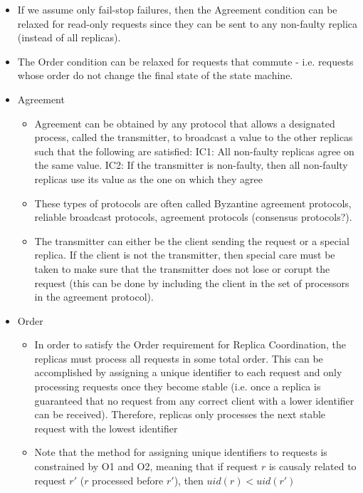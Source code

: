 \documentclass[a4paper]{article}
\begin{document}
\begin{itemize}
\begin{itemize}
\item If we assume only fail-stop failures, then the Agreement condition can be relaxed for read-only requests since they can be sent to any non-faulty replica (instead of all replicas).

\item The Order condition can be relaxed for requests that commute - i.e. requests whose order do not change the final state of the state machine.

\item Agreement
\begin{itemize}

\item Agreement can be obtained by any protocol that allows a designated process, called the transmitter, to broadcast a value to the other replicas such that the following are satisfied: IC1: All non-faulty replicas agree on the same value. IC2: If the transmitter is non-faulty, then all non-faulty replicas use its value as the one on which they agree

\item These types of protocols are often called Byzantine agreement protocols, reliable broadcast protocols, agreement protocols (consensus protocols?).

\item The transmitter can either be the client sending the request or a special replica. If the client is not the transmitter, then special care must be taken to make sure that the transmitter does not lose or corupt the request (this can be done by including the client in the set of processors in the agreement protocol).


\end{itemize}

\item Order
\begin{itemize}
\item In order to satisfy the Order requirement for Replica Coordination, the replicas must process all requests in some total order. This can be accomplished by assigning a unique identifier to each request and only processing requests once they become stable (i.e. once a replica is guaranteed that no request from any correct client with a lower identifier can be received). Therefore, replicas only processes the next stable request with the lowest identifier

\item Note that the method for assigning unique identifiers to requests is constrained by O1 and O2, meaning that if request $r$ is causaly related to request $r'$ ($r$ processed before $r'$), then $uid(r) < uid(r')$


\end{itemize}
\end{itemize}
\end{itemize}
\end{document}
